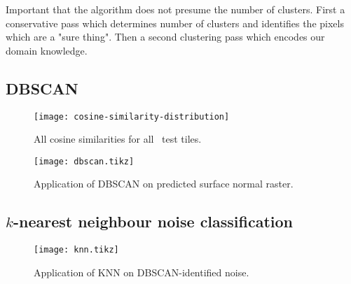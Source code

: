 Important that the algorithm does not presume the number of clusters.
First a conservative pass which determines number of clusters and identifies the pixels which are a "sure thing".
Then a second clustering pass which encodes our domain knowledge.

\subsection{DBSCAN}

\begin{figure}[H]
  \centering
  \texttt{[image: cosine-similarity-distribution]}
  \caption{All cosine similarities for all \numtesttiles~test tiles.}
\end{figure}

\begin{figure}[H]
  \centering
  \texttt{[image: dbscan.tikz]}
  \caption{Application of DBSCAN on predicted surface normal raster.}
\end{figure}

\subsection{\texorpdfstring{$k$}{k}-nearest neighbour noise classification}

\begin{figure}[H]
  \centering
  \texttt{[image: knn.tikz]}
  \caption{Application of KNN on DBSCAN-identified noise.}
\end{figure}
